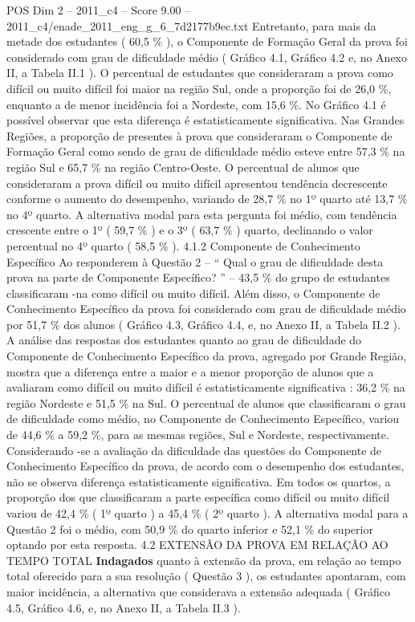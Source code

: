 \begin{textsample}{POS Dim 2 – 2011\_c4 – Score 9.00 – 2011\_c4/enade\_2011\_eng\_g\_6\_7d2177b9ec.txt}
Entretanto, para mais da metade dos estudantes ( 60,5 \% ), o Componente de Formação Geral da prova foi considerado com grau de dificuldade médio ( Gráfico 4.1, Gráfico 4.2 e, no Anexo II, a Tabela II.1 ).
O percentual de estudantes que consideraram a prova como difícil ou muito difícil foi maior na região Sul, onde a proporção foi de 26,0 \%, enquanto a de menor incidência foi a Nordeste, com 15,6 \%.
No Gráfico 4.1 é possível observar que esta diferença é estatisticamente significativa.
Nas Grandes Regiões, a proporção de presentes à prova que consideraram o Componente de Formação Geral como sendo de grau de dificuldade médio esteve entre 57,3 \% na região Sul e 65,7 \% na região Centro-Oeste.
O percentual de alunos que consideraram a prova difícil ou muito difícil apresentou tendência decrescente conforme o aumento do desempenho, variando de 28,7 \% no 1º quarto até 13,7 \% no 4º quarto.
A alternativa modal para esta pergunta foi médio, com tendência crescente entre o 1º ( 59,7 \% ) e o 3º ( 63,7 \% ) quarto, declinando o valor percentual no 4º quarto ( 58,5 \% ). 4.1.2 Componente de Conhecimento Específico Ao responderem à Questão 2 – “ Qual o grau de dificuldade desta prova na parte de Componente Específico? ” – 43,5 \% do grupo de estudantes classificaram -na como difícil ou muito difícil.
Além disso, o Componente de Conhecimento Específico da prova foi considerado com grau de dificuldade médio por 51,7 \% dos alunos ( Gráfico 4.3, Gráfico 4.4, e, no Anexo II, a Tabela II.2 ).
A análise das respostas dos estudantes quanto ao grau de dificuldade do Componente de Conhecimento Específico da prova, agregado por Grande Região, mostra que a diferença entre a maior e a menor proporção de alunos que a avaliaram como difícil ou muito difícil é estatisticamente significativa : 36,2 \% na região Nordeste e 51,5 \% na Sul.
O percentual de alunos que classificaram o grau de dificuldade como médio, no Componente de Conhecimento Específico, variou de 44,6 \% a 59,2 \%, para as mesmas regiões, Sul e Nordeste, respectivamente.
Considerando -se a avaliação da dificuldade das questões do Componente de Conhecimento Específico da prova, de acordo com o desempenho dos estudantes, não se observa diferença estatisticamente significativa.
Em todos os quartos, a proporção dos que classificaram a parte específica como difícil ou muito difícil variou de 42,4 \% ( 1º quarto ) a 45,4 \% ( 2º quarto ).
A alternativa modal para a Questão 2 foi o médio, com 50,9 \% do quarto inferior e 52,1 \% do superior optando por esta resposta. 4.2 EXTENSÃO DA PROVA EM RELAÇÃO AO TEMPO TOTAL \textbf{Indagados} quanto à extensão da prova, em relação ao tempo total oferecido para a sua resolução ( Questão 3 ), os estudantes apontaram, com maior incidência, a alternativa que considerava a extensão adequada ( Gráfico 4.5, Gráfico 4.6, e, no Anexo II, a Tabela II.3 ).

\end{textsample}

